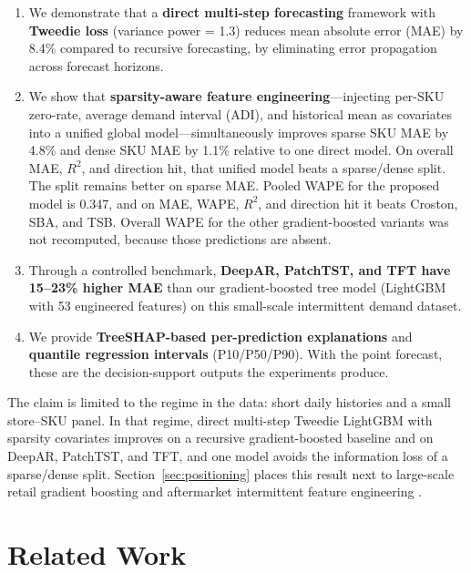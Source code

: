 \documentclass[review,authoryear]{elsarticle}
\begin{document}
\begin{enumerate}
    \item We demonstrate that a \textbf{direct multi-step forecasting} framework with \textbf{Tweedie loss} (variance power = 1.3) reduces mean absolute error (MAE) by 8.4\% compared to recursive forecasting, by eliminating error propagation across forecast horizons.
    \item We show that \textbf{sparsity-aware feature engineering}---injecting per-SKU zero-rate, average demand interval (ADI), and historical mean as covariates into a unified global model---simultaneously improves sparse SKU MAE by 4.8\% and dense SKU MAE by 1.1\% relative to one direct model. On overall MAE, $R^{2}$, and direction hit, that unified model beats a sparse/dense split. The split remains better on sparse MAE. Pooled WAPE for the proposed model is 0.347, and on MAE, WAPE, $R^{2}$, and direction hit it beats Croston, SBA, and TSB. Overall WAPE for the other gradient-boosted variants was not recomputed, because those predictions are absent.
    \item Through a controlled benchmark, \textbf{DeepAR, PatchTST, and TFT have 15--23\% higher MAE} than our gradient-boosted tree model (LightGBM with 53 engineered features) on this small-scale intermittent demand dataset.
    \item We provide \textbf{TreeSHAP-based per-prediction explanations} and \textbf{quantile regression intervals} (P10/P50/P90). With the point forecast, these are the decision-support outputs the experiments produce.
\end{enumerate}

The claim is limited to the regime in the data: short daily histories and a small store--SKU panel. In that regime, direct multi-step Tweedie LightGBM with sparsity covariates improves on a recursive gradient-boosted baseline and on DeepAR, PatchTST, and TFT, and one model avoids the information loss of a sparse/dense split. Section~\ref{sec:positioning} places this result next to large-scale retail gradient boosting \citep{long2025ijpe} and aftermarket intermittent feature engineering \citep{nathan2026scirep}.

\section{Related Work}
\end{document}
